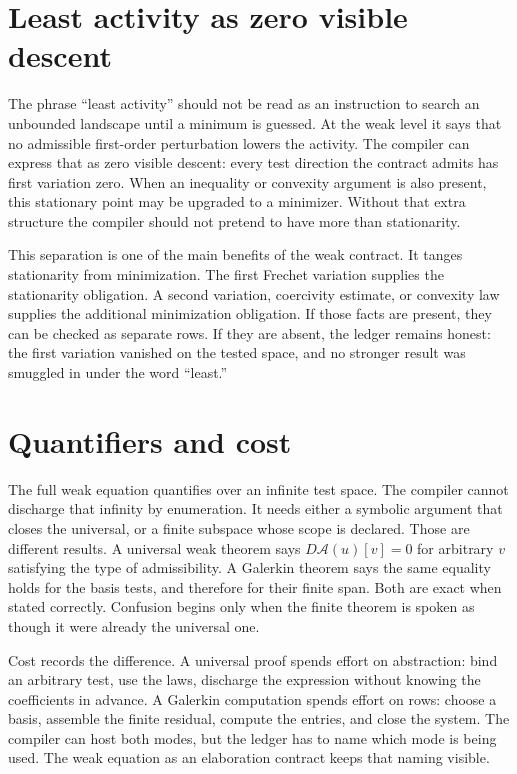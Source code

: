 \section{Least activity as zero visible descent}
\label{se:least-activity-zero-visible-descent}

The phrase ``least activity'' should not be read as an instruction to search an unbounded landscape until a
minimum is guessed. At the weak level it says that no admissible first-order perturbation lowers the
activity. The compiler can express that as zero visible descent: every test direction the contract admits
has first variation zero. When an inequality or convexity argument is also present, this stationary point
may be upgraded to a minimizer. Without that extra structure the compiler should not pretend to have more
than stationarity.

This separation is one of the main benefits of the weak contract. It tanges stationarity from minimization.
The first Frechet variation supplies the stationarity obligation. A second variation, coercivity estimate,
or convexity law supplies the additional minimization obligation. If those facts are present, they can be
checked as separate rows. If they are absent, the ledger remains honest: the first variation vanished on
the tested space, and no stronger result was smuggled in under the word ``least.''

\section{Quantifiers and cost}
\label{se:weak-quantifiers-and-cost}

The full weak equation quantifies over an infinite test space. The compiler cannot discharge that infinity
by enumeration. It needs either a symbolic argument that closes the universal, or a finite subspace whose
scope is declared. Those are different results. A universal weak theorem says \(D\mathcal A(u)[v]=0\) for
arbitrary \(v\) satisfying the type of admissibility. A Galerkin theorem says the same equality holds for
the basis tests, and therefore for their finite span. Both are exact when stated correctly. Confusion
begins only when the finite theorem is spoken as though it were already the universal one.

Cost records the difference. A universal proof spends effort on abstraction: bind an arbitrary test, use
the laws, discharge the expression without knowing the coefficients in advance. A Galerkin computation
spends effort on rows: choose a basis, assemble the finite residual, compute the entries, and close the
system. The compiler can host both modes, but the ledger has to name which mode is being used. The weak
equation as an elaboration contract keeps that naming visible.
